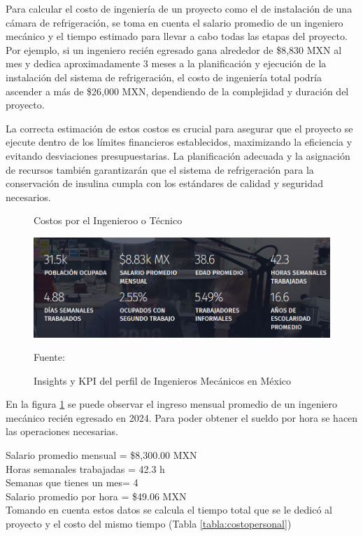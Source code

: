 Para calcular el costo de ingeniería de un proyecto como el de instalación de una cámara de refrigeración, se toma en cuenta el salario promedio de un ingeniero mecánico y el tiempo estimado para llevar a cabo todas las etapas del proyecto. Por ejemplo, si un ingeniero recién egresado gana alrededor de \$8,830 MXN al mes y dedica aproximadamente 3 meses a la planificación y ejecución de la instalación del sistema de refrigeración, el costo de ingeniería total podría ascender a más de \$26,000 MXN, dependiendo de la complejidad y duración del proyecto.

La correcta estimación de estos costos es crucial para asegurar que el proyecto se ejecute dentro de los límites financieros establecidos, maximizando la eficiencia y evitando desviaciones presupuestarias. La planificación adecuada y la asignación de recursos también garantizarán que el sistema de refrigeración para la conservación de insulina cumpla con los estándares de calidad y seguridad necesarios.
 
 
  
  \begin{figure}[H]
  	\centering
  	\caption{Costos por el Ingenieroo o Técnico}
  	\includegraphics[width=0.6\linewidth]{figures/mecanicos}
  	\caption{Insights y KPI del perfil de Ingenieros Mecánicos en México}
  	Fuente: \cite{salarioingeniero}
  	\label{fig:mecanicos}
  \end{figure}
  
  En la figura \ref{fig:mecanicos} se puede observar el ingreso mensual promedio de un ingeniero mecánico recién egresado en 2024. Para poder obtener el sueldo por hora se hacen las operaciones
  necesarias.
  
  Salario promedio mensual = \$8,300.00 MXN\\
  Horas semanales trabajadas = 42.3 h\\
  Semanas que tienes un mes= 4\\
  Salario promedio por hora =  \$49.06 MXN\\
  
  Tomando en cuenta estos datos se calcula el tiempo total que se le dedicó al proyecto y el costo del mismo tiempo (Tabla \ref{tabla:costopersonal})
  
